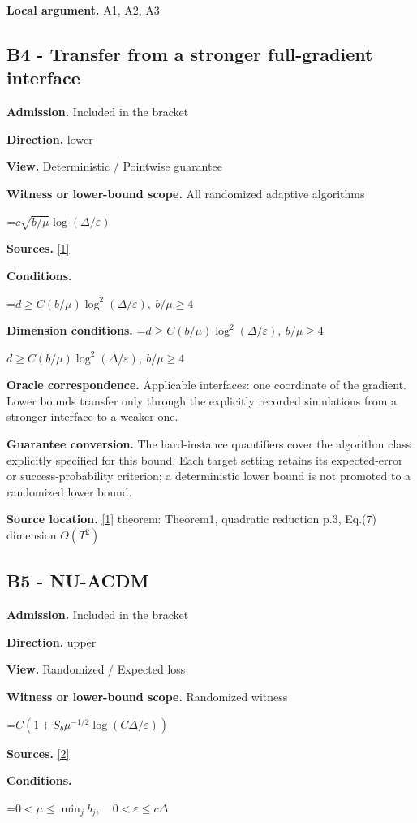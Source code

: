 \documentclass[10pt,a4paper]{article}
\newcommand{\AtlasMath}[1]{\par\begingroup\centering\setbox0=\hbox{$\displaystyle #1$}\ifdim\wd0>1.4\linewidth\typeout{ATLAS WIDE FORMULA: \the\wd0}\fi\ifdim\wd0>\linewidth\resizebox{\linewidth}{!}{\box0}\else\box0\fi\par\endgroup}
\newcommand{\AtlasInlineMath}[1]{\begingroup\setbox0=\hbox{$#1$}\ifdim\wd0>.4\linewidth\endgroup\AtlasMath{#1}\else\endgroup$#1$\fi}
\begin{document}
\textbf{Local argument.} A1, A2, A3

\subsection{B4 - Transfer from a stronger full-gradient interface}
\textbf{Admission.} Included in the bracket

\textbf{Direction.} lower

\textbf{View.} Deterministic / Pointwise guarantee

\textbf{Witness or lower-bound scope.} All randomized adaptive algorithms

\AtlasMath{c\sqrt{b/\mu}\log(\Delta/\varepsilon)}
\textbf{Sources.} \href{https://arxiv.org/pdf/2609.10874}{[1]}

\textbf{Conditions.} 
\AtlasMath{d\ge C(b/\mu)\log^2(\Delta/\varepsilon),\ b/\mu\ge4}


\textbf{Dimension conditions.} \AtlasInlineMath{d\ge C(b/\mu)\log^2(\Delta/\varepsilon),\ b/\mu\ge4}

\textbf{Oracle correspondence.} Applicable interfaces: one coordinate of the gradient. Lower bounds transfer only through the explicitly recorded simulations from a stronger interface to a weaker one.

\textbf{Guarantee conversion.} The hard-instance quantifiers cover the algorithm class explicitly specified for this bound. Each target setting retains its expected-error or success-probability criterion; a deterministic lower bound is not promoted to a randomized lower bound.

\textbf{Source location.} \href{https://arxiv.org/pdf/2609.10874}{[1]} theorem: Theorem1, quadratic reduction p.3, Eq.(7) dimension $O(T^2)$

\subsection{B5 - NU-ACDM}
\textbf{Admission.} Included in the bracket

\textbf{Direction.} upper

\textbf{View.} Randomized / Expected loss

\textbf{Witness or lower-bound scope.} Randomized witness

\AtlasMath{C(1+S_b\mu^{-1/2}\log(C\Delta/\varepsilon))}
\textbf{Sources.} \href{https://arxiv.org/pdf/1512.09103}{[2]}

\textbf{Conditions.} 
\AtlasMath{0<\mu\le\min_jb_j,\quad0<\varepsilon\le c\Delta}
\end{document}
